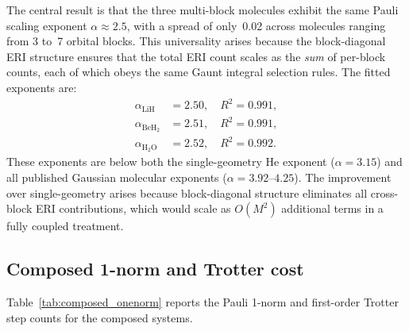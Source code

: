 \documentclass[aps,pra,twocolumn,superscriptaddress,longbibliography]{revtex4-2}
\begin{document}
The central result is that the three multi-block molecules exhibit the
same Pauli scaling exponent $\alpha \approx 2.5$, with a spread of
only~0.02 across molecules ranging from 3 to~7 orbital blocks.  This
universality arises because the block-diagonal ERI structure ensures
that the total ERI count scales as the \emph{sum} of per-block
counts, each of which obeys the same Gaunt integral selection rules.
The fitted exponents are:
\begin{align}
  \alpha_{\mathrm{LiH}}   &= 2.50, \quad R^2 = 0.991, \label{eq:alpha_lih} \\
  \alpha_{\mathrm{BeH}_2} &= 2.51, \quad R^2 = 0.991, \label{eq:alpha_beh2} \\
  \alpha_{\mathrm{H}_2\mathrm{O}} &= 2.52, \quad R^2 = 0.992. \label{eq:alpha_h2o}
\end{align}
These exponents are below both the single-geometry He exponent
($\alpha = 3.15$) and all published Gaussian molecular exponents
($\alpha = 3.92$--$4.25$).  The improvement over single-geometry
arises because block-diagonal structure eliminates all cross-block
ERI contributions, which would scale as $O(M^2)$ additional terms
in a fully coupled treatment.


\subsection{Composed 1-norm and Trotter cost}
\label{sec:composed_onenorm}

Table~\ref{tab:composed_onenorm} reports the Pauli 1-norm and
first-order Trotter step counts for the composed systems.
\end{document}
